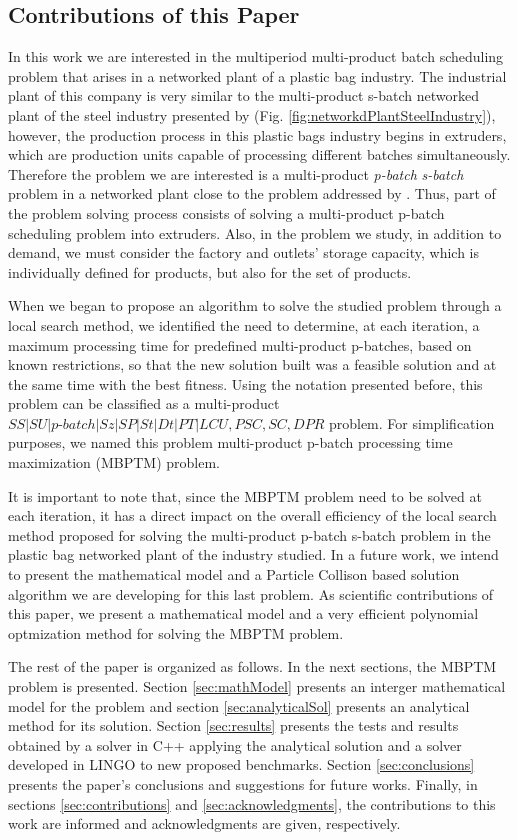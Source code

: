 \documentclass[10pt,fleqn,a4paper,twoside]{article}
\begin{document}
\subsection{Contributions of this Paper}

In this work we are interested in the multiperiod multi-product batch scheduling problem that arises in a networked plant of a plastic bag industry. The industrial plant of this company is very similar to the multi-product s-batch networked plant of the steel industry presented by \cite{LiuEtAl2020} (Fig. \ref{fig:networkdPlantSteelIndustry}), however, the production process in this plastic bags industry begins in extruders, which are production units capable of processing different batches simultaneously. Therefore the problem we are interested is a multi-product \emph{p-batch} \emph{s-batch} problem in a networked plant close to the problem addressed by \cite{LiEtAl2022}. Thus, part of the problem solving process consists of solving a multi-product p-batch scheduling problem into extruders. Also, in the problem we study, in addition to demand, we must consider the factory and outlets' storage capacity, which is individually defined for products, but also for the set of products.

When we began to propose an algorithm to solve the studied problem through a local search method, we identified the need to determine, at each iteration, a maximum processing time for predefined multi-product p-batches, based on known restrictions, so that the new solution built was a feasible solution and at the same time with the best fitness. Using the notation presented before, this problem can be classified as a multi-product $SS|SU|p\textrm{-}batch|Sz|SP|St|Dt|PT|LCU, PSC, SC, DPR$ problem. For simplification purposes, we named this problem multi-product p-batch processing time maximization (MBPTM) problem.

It is important to note that, since the MBPTM problem need to be solved at each iteration, it has a direct impact on the overall efficiency of the local search method proposed for solving the multi-product p-batch s-batch problem in the plastic bag networked plant of the industry studied. In a future work, we intend to present the mathematical model and a Particle Collison based solution algorithm we are developing for this last problem. As scientific contributions of this paper, we present a mathematical model and a very efficient polynomial optmization method for solving the MBPTM problem.

The rest of the paper is organized as follows. In the next sections, the MBPTM problem is presented. Section \ref{sec:mathModel} presents an interger mathematical model for the problem and section \ref{sec:analyticalSol} presents an analytical method for its solution. Section \ref{sec:results} presents the tests and results obtained by a solver in C++ applying the analytical solution and a solver developed in LINGO to new proposed benchmarks. Section \ref{sec:conclusions} presents the paper's conclusions and suggestions for future works. Finally, in sections \ref{sec:contributions} and \ref{sec:acknowledgments}, the contributions to this work are informed and acknowledgments are given, respectively.
\end{document}

